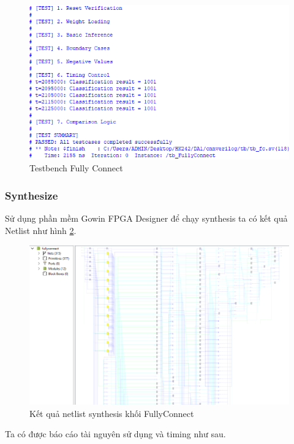 \begin{figure}[H]
    \centering
    \includegraphics[width=0.75\linewidth]{Images/tbfc.png}
    \caption{Testbench Fully Connect}
    \label{fig:enter-label}
\end{figure}

\subsubsection{Synthesize}
Sử dụng phần mềm Gowin FPGA Designer để chạy synthesis ta có kết quả Netlist như hình \ref{fig:fc_synth}.
\begin{figure}[H]
    \centering
    \includegraphics[width=0.75\linewidth]{Images/fcsynth.png}
    \caption{Kết quả netlist synthesis khối FullyConnect}
    \label{fig:fc_synth}
\end{figure}

Ta có được báo cáo tài nguyên sử dụng và timing như sau.

